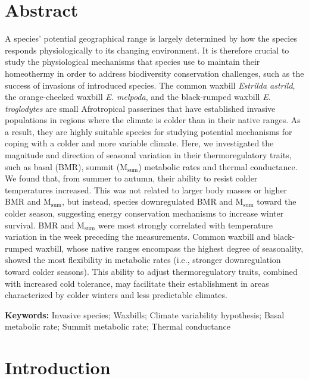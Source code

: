 \documentclass[10pt, twoside]{book} %
\begin{document}
\section{Abstract}
A species' potential geographical range is largely determined by how the species responds physiologically to its changing environment. It is therefore crucial to study the physiological mechanisms that species use to maintain their homeothermy in order to address biodiversity conservation challenges, such as the success of invasions of introduced species. The common waxbill \textit{Estrilda astrild}, the orange-cheeked waxbill \textit{E. melpoda}, and the black-rumped waxbill \textit{E. troglodytes} are small Afrotropical passerines that have established invasive populations in regions where the climate is colder than in their native ranges. As a result, they are highly suitable species for studying potential mechanisms for coping with a colder and more variable climate. Here, we investigated the magnitude and direction of seasonal variation in their thermoregulatory traits, such as basal (BMR), summit (M$_{\text{sum}}$) metabolic rates and thermal conductance. We found that, from summer to autumn, their ability to resist colder temperatures increased. This was not related to larger body masses or higher BMR and M$_{\text{sum}}$, but instead, species downregulated BMR and M$_{\text{sum}}$ toward the colder season, suggesting energy conservation mechanisms to increase winter survival. BMR and M$_{\text{sum}}$ were most strongly correlated with temperature variation in the week preceding the measurements. Common waxbill and black-rumped waxbill, whose native ranges encompass the highest degree of seasonality, showed the most flexibility in metabolic rates (i.e., stronger downregulation toward colder seasons). This ability to adjust thermoregulatory traits, combined with increased cold tolerance, may facilitate their establishment in areas characterized by colder winters and less predictable climates.



\vspace*{\fill}
\noindent \textbf{Keywords:} Invasive species; Waxbills; Climate variability hypothesis; Basal metabolic rate; Summit metabolic rate; Thermal conductance
	
\clearpage

\section{Introduction}
\end{document}
